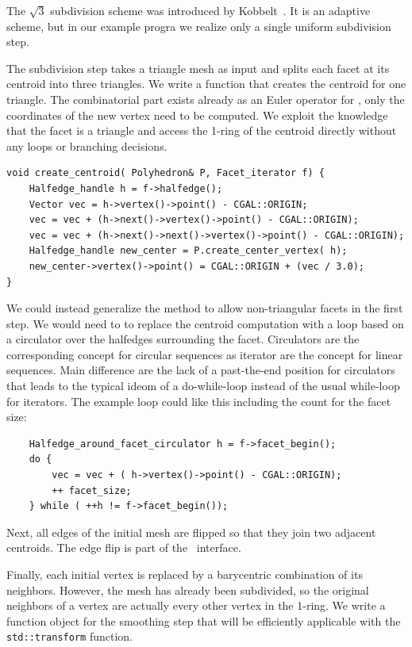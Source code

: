 
The $\sqrt{3}$ subdivision scheme was introduced by
Kobbelt~\cite{sqrt3}. It is an adaptive scheme, but in our example
progra we realize only a single uniform subdivision step.

The subdivision step takes a triangle mesh as input and splits each
facet at its centroid into three triangles.  We write a function that
creates the centroid for one triangle. The combinatorial part exists
already as an Euler operator for \cgalpoly, only the coordinates of
the new vertex need to be computed. We exploit the knowledge that the
facet is a triangle and access the 1-ring of the centroid directly
without any loops or branching decisions.

\begin{lstlisting}
void create_centroid( Polyhedron& P, Facet_iterator f) {
    Halfedge_handle h = f->halfedge();
    Vector vec = h->vertex()->point() - CGAL::ORIGIN;
    vec = vec + (h->next()->vertex()->point() - CGAL::ORIGIN);
    vec = vec + (h->next()->next()->vertex()->point() - CGAL::ORIGIN);
    Halfedge_handle new_center = P.create_center_vertex( h);
    new_center->vertex()->point() = CGAL::ORIGIN + (vec / 3.0);
}
\end{lstlisting}

We could instead generalize the method to allow non-triangular facets
in the first step. We would need to to replace the centroid
computation with a loop based on a circulator over the halfedges
surrounding the facet. Circulators are the corresponding concept for
circular sequences as iterator are the concept for linear sequences.
Main difference are the lack of a past-the-end position for
circulators that leads to the typical ideom of a do-while-loop instead
of the usual while-loop for iterators. The example loop could like this
including the count for the facet size:

\begin{lstlisting}
    Halfedge_around_facet_circulator h = f->facet_begin();
    do {
        vec = vec + ( h->vertex()->point() - CGAL::ORIGIN);
        ++ facet_size;
    } while ( ++h != f->facet_begin());
\end{lstlisting}

Next, all edges of the initial mesh are flipped so that they join two
adjacent centroids. The edge flip is part of the \cgalpoly\ interface.

Finally, each initial vertex is replaced by a barycentric combination
of its neighbors. However, the mesh has already been subdivided, so
the original neighbors of a vertex are actually every other vertex in
the 1-ring. We write a function object for the smoothing step that
will be efficiently applicable with the \lstinline!std::transform!
function.

